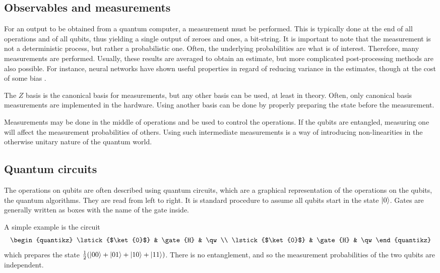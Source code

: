 \subsection{Observables and measurements}
For an output to be obtained from a quantum computer, a measurement must be performed.
This is typically done at the end of all operations and of all qubits, thus yielding a single output of zeroes and ones, a bit-string.
It is important to note that the measurement is not a deterministic process, but rather a probabilistic one.
Often, the underlying probabilities are what is of interest.
Therefore, many measurements are performed.
Usually, these results are averaged to obtain an estimate, but more complicated post-processing methods are also possible.
For instance, neural networks have shown useful properties in regard of reducing variance in the estimates, though at the cost of some bias \cite{torlai2020}.

The $Z$ basis is the canonical basis for measurements, but any other basis can be used, at least in theory.
Often, only canonical basis measurements are implemented in the hardware.
Using another basis can be done by properly preparing the state before the measurement.

Measurements may be done in the middle of operations and be used to control the operations.
If the qubits are entangled, measuring one will affect the measurement probabilities of others.
Using such intermediate measurements is a way of introducing non-linearities in the otherwise unitary nature of the quantum world.


\subsection{Quantum circuits}
The operations on qubits are often described using quantum circuits, which are a graphical representation of the operations on the qubits, the quantum algorithms.
They are read from left to right.
It is standard procedure to assume all qubits start in the state $\ket{0}$.
Gates are generally written as boxes with the name of the gate inside.

A simple example is the circuit
\begin{equation}
    \begin{quantikz}
        \lstick{$\ket{0}$} & \gate{H} & \qw \\
        \lstick{$\ket{0}$} & \gate{H} & \qw
    \end{quantikz}
\end{equation}
which prepares the state $\frac{1}{2}(\ket{00} + \ket{01} + \ket{10} + \ket{11})$.
There is no entanglement, and so the measurement probabilities of the two qubits are independent.

